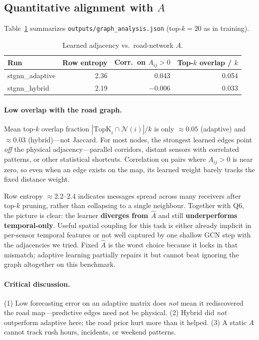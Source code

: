 \subsection{Quantitative alignment with $A$}

Table~\ref{tab:graph-analysis} summarizes \texttt{outputs/graph\_analysis.json} (top-$k=20$ as in training).

\begin{table}[t]
  \centering
  \caption{Learned adjacency vs.\ road-network $A$.}
  \label{tab:graph-analysis}
  \begin{tabular}{lrrr}
    \toprule
    Run & Row entropy & Corr.\ on $A_{ij}>0$ & Top-$k$ overlap / $k$ \\
    \midrule
    stgnn\_adaptive & 2.36 & 0.043 & 0.054 \\
    stgnn\_hybrid & 2.19 & $-0.006$ & 0.033 \\
    \bottomrule
  \end{tabular}
\end{table}

\paragraph{Low overlap with the road graph.}
Mean top-$k$ overlap fraction $|{\mathrm{TopK}_i\cap\mathcal{N}(i)}|/k$ is only $\approx 0.05$ (adaptive) and $\approx 0.03$ (hybrid)---not Jaccard.
For most nodes, the strongest learned edges point \emph{off} the physical adjacency---parallel corridors, distant sensors with correlated patterns, or other statistical shortcuts.
Correlation on pairs where $A_{ij}>0$ is near zero, so even when an edge exists on the map, its learned weight barely tracks the fixed distance weight.

Row entropy $\approx 2.2$--$2.4$ indicates messages spread across many receivers after top-$k$ pruning, rather than collapsing to a single neighbour.
Together with Q6, the picture is clear: the learner \textbf{diverges from $\hat{A}$} and still \textbf{underperforms temporal-only}.
Useful spatial coupling for this task is either already implicit in per-sensor temporal features or not well captured by one shallow GCN step with the adjacencies we tried.
Fixed $\hat{A}$ is the worst choice because it locks in that mismatch; adaptive learning partially repairs it but cannot beat ignoring the graph altogether on this benchmark.

\paragraph{Critical discussion.}
(1) Low forecasting error on an adaptive matrix does \emph{not} mean it rediscovered the road map---predictive edges need not be physical.
(2) Hybrid did \emph{not} outperform adaptive here; the road prior hurt more than it helped.
(3) A static $A$ cannot track rush hours, incidents, or weekend patterns.

